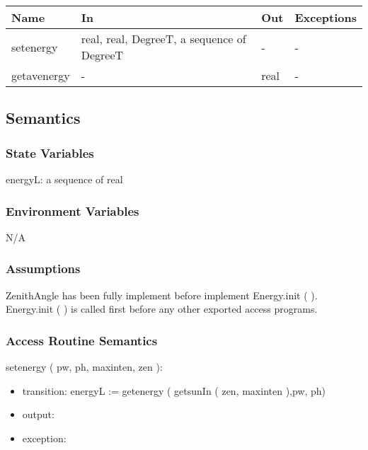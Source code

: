 \documentclass[12pt, titlepage]{article}
\begin{document}
\begin{center}
\begin{tabular}{p{2cm} p{5cm} p{4cm} p{1cm}}
\hline
\textbf{Name} & \textbf{In} & \textbf{Out} & \textbf{Exceptions} \\
\hline 
setenergy & real, real, DegreeT, a sequence of DegreeT & - & - \\
getavenergy & - & real & - \\

\hline
\end{tabular}
\end{center}


\subsection{Semantics}

\subsubsection{State Variables}

energyL: a sequence of real\\

\subsubsection{Environment Variables}

N/A

\subsubsection{Assumptions}
ZenithAngle has been fully implement before implement Energy.init ( ).\\
Energy.init ( ) is called first before any other exported access programs.\\


\subsubsection{ Access Routine Semantics}

\noindent  setenergy ( pw, ph, maxinten, zen ):
\begin{itemize}
\item transition:
energyL := getenergy ( getsunIn ( zen, maxinten ),pw, ph)
\item output:
 
\item exception: 
\end{itemize}
\end{document}
